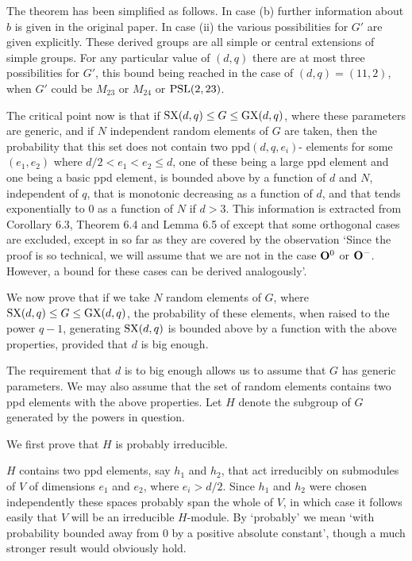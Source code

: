 \documentclass[12pt]{article}
\def\O{{\bf O}}
\def\PSL{{\rm PSL}}
\def\SX{{\rm SX}}
\def\GX{{\rm GX}}
\begin{document}
The theorem has been simplified as follows.  In case (b) further information
about $b$ is given in the original paper.  In case (ii) the various possibilities for 
$G'$ are
given explicitly.  These derived groups are all simple or central
extensions of simple groups.  For any particular value of $(d,q)$ there
are at most three possibilities for $G'$, this bound being reached in
the case of $(d,q)=(11,2)$, when $G'$ could be $M_{23}$ or $M_{24}$ or
$\PSL(2,23)$.

The critical point now is that if $\SX(d,q)\le G\le\GX(d,q)$, where
these parameters are generic, and if $N$ independent random elements of
$G$ are taken, then the probability that this set does not contain
two ppd$(d,q,e_i)$-
elements for some $(e_1,e_2)$ where $d/2<e_1<e_2\le d$, one of these
being a large ppd element and one being a basic ppd element, is
bounded above by a function of $d$ and $N$, independent of $q$, that
is monotonic decreasing as a function of $d$, and that tends exponentially
to 0 as a function of $N$ if $d>3$.  This information is extracted from
Corollary 6.3, Theorem 6.4 and Lemma 6.5 of \cite{NP} except that some orthogonal
cases are excluded, except in so far as they are covered by the observation
`Since the proof is so technical, we will assume that we are not in the case 
$\O^0$ or $\O^-$.  However, a bound for these cases can be derived analogously'.

We now prove that if we take $N$ random elements of $G$, where
$\SX(d,q)\le G\le\GX(d,q)$, the probability of these elements, when
raised to the power $q-1$, generating $\SX(d,q)$ is bounded above by a 
function with the above properties, provided that $d$ is big enough.

The requirement that $d$ is to big enough allows us to assume that
$G$ has generic parameters.  We may also assume that the set of
random elements contains two ppd elements with the above properties.
Let $H$ denote the subgroup of $G$ generated by the powers in question.

We first prove that $H$ is probably irreducible.

$H$ contains two ppd elements, say $h_1$ and $h_2$, that act irreducibly on
submodules of $V$ of dimensions $e_1$ and $e_2$, where $e_i>d/2$.  Since
$h_1$ and $h_2$ were chosen independently these spaces probably span the
whole of $V$, in which case it follows easily that $V$ will be an irreducible
$H$-module.  By `probably' we mean `with probability bounded away from 0 by a positive
absolute constant', though a much stronger result would obviously hold.
\end{document}
